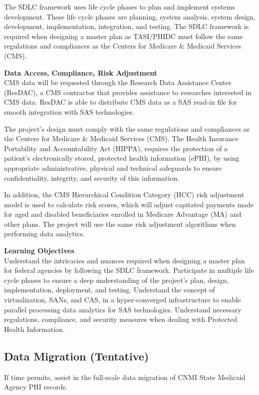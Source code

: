 \documentclass[11pt]{article}
\begin{document}
The SDLC framework uses life cycle phases to plan and implement systems development. These life cycle phases are planning, system analysis, system design, development, implementation, integration, and testing. The SDLC framework is required when designing a master plan as TASI/PHIDC must follow the same regulations and compliances as the Centers for Medicare \& Medicaid Services (CMS).  

\textbf{Data Access, Compliance, Risk Adjustment}\\
CMS data will be requested through the Research Data Assistance Center (ResDAC), a CMS contractor that provides assistance to researches interested in CMS data. ResDAC is able to distribute CMS data as a SAS read-in file for smooth integration with SAS technologies. 

The project's design must comply with the same regulations and compliances as the Centers for Medicare \& Medicaid Services (CMS). The Health Insurance Portability and Accountability Act (HIPPA), requires the protection of a patient's electronically stored, protected health information (ePHI), by using appropriate administrative, physical and technical safeguards to ensure confidentiality, integrity, and security of this information. 

In addition, the CMS Hierarchical Condition Category (HCC) risk adjustment model is used to calculate risk scores, which will adjust capitated payments made for aged and disabled beneficiaries enrolled in Medicare Advantage (MA) and other plans. The project will use the same risk adjustment algorithms when performing data analytics.

\textbf{Learning Objectives}\\
Understand the intricacies and nuances required when designing a master plan for federal agencies by following the SDLC framework. Participate in multiple life cycle phases to ensure a deep understanding of the project’s plan, design, implementation, deployment, and testing. Understand the concept of virtualization, SANs, and CAS, in a hyper-converged infrastructure to enable parallel processing data analytics for SAS technologies. Understand necessary regulations, compliance, and security measures when dealing with Protected Health Information. 

\subsection{Data Migration (Tentative)}
If time permits, assist in the full-scale data migration of CNMI State Medicaid Agency PHI records. 
\end{document}
